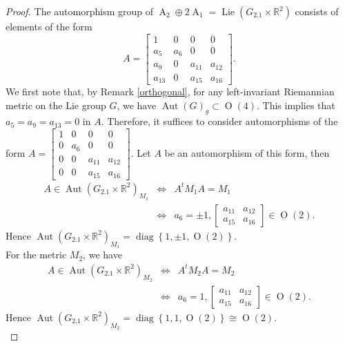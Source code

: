 \documentclass[12pt,a4paper,twoside]{article}
\theoremstyle{definition}
\begin{document}
\begin{proof}
The automorphism group of $\operatorname{A}_{2} \oplus 2\operatorname{A}_1 = \operatorname{Lie}\left(G_{2.1} \times \mathbb{R}^2\right)$ consists of elements of the form \cite{christodoulakis2003automorphisms}
$$A = \begin{bmatrix}
1 & 0 & 0 & 0\\
a_5 & a_6 & 0 & 0\\
a_9 & 0 & a_{11} & a_{12}\\
a_{13} & 0 & a_{15} & a_{16}
\end{bmatrix}.$$
We first note that, by Remark \ref{orthogonal}, for any left-invariant Riemannian metric on the Lie group $G$, we have $\operatorname{Aut}(G)_g \subset \operatorname{O}(4)$. This implies that $a_5 = a_9 = a_{13} = 0$ in $A$. Therefore, it suffices to consider automorphisms of the form $A = \begin{bmatrix}
1 & 0 & 0 & 0\\
0 & a_6 & 0 & 0\\
0 & 0 & a_{11} & a_{12}\\
0 & 0 & a_{15} & a_{16}
\end{bmatrix}$. Let $A$ be an automorphism of this form, then
\begin{eqnarray*}
A \in \operatorname{Aut}\left(G_{2.1} \times \mathbb{R}^2\right)_{M_1} &\Leftrightarrow& A^tM_1A = M_1\\
&\Leftrightarrow& a_6 = \pm1, \begin{bmatrix}
a_{11} & a_{12}\\
a_{15} & a_{16}
\end{bmatrix} \in \operatorname{O}(2).
\end{eqnarray*}	Hence $\operatorname{Aut}\left(G_{2.1} \times \mathbb{R}^2\right)_{M_1}  = \operatorname{diag}\left\lbrace 1, \pm1, \operatorname{O}(2)\right\rbrace$.\\
For the metric $M_2$, we have
\begin{eqnarray*}
A \in \operatorname{Aut}\left(G_{2.1} \times \mathbb{R}^2\right)_{M_2} &\Leftrightarrow& A^tM_2A = M_2\\
&\Leftrightarrow& a_6 = 1, \begin{bmatrix}
a_{11} & a_{12}\\
a_{15} & a_{16}
\end{bmatrix} \in \operatorname{O}(2).
\end{eqnarray*}	Hence $\operatorname{Aut}\left(G_{2.1} \times \mathbb{R}^2\right)_{M_2}  = \operatorname{diag}\left\lbrace 1, 1, \operatorname{O}(2)\right\rbrace \cong \operatorname{O}(2)$.\\

\end{proof}
\end{document}
